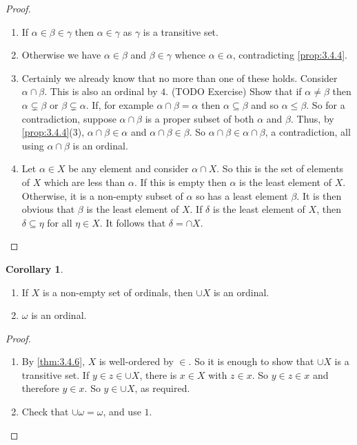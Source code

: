 \documentclass{article}
\theoremstyle{definition}\newtheorem{definition}{Definition}[subsection]
\theoremstyle{definition}\newtheorem{remark}[definition]{Remark}
\theoremstyle{definition}\newtheorem*{example}{Example}
\theoremstyle{definition}\newtheorem*{note}{Note}
\newtheorem{corollary}[definition]{Corollary}
\begin{document}
\begin{proof}
\hfill
\begin{enumerate}
\item If $ \alpha \in \beta \in \gamma $ then $ \alpha \in \gamma $ as $ \gamma $ is a transitive set.
\item Otherwise we have $ \alpha \in \beta $ and $ \beta \in \gamma $ whence $ \alpha \in \alpha $, contradicting \ref{prop:3.4.4}.
\item Certainly we already know that no more than one of these holds. Consider $ \alpha \cap \beta $. This is also an ordinal by $ 4 $. (TODO Exercise) Show that if $ \alpha \ne \beta $ then $ \alpha \subsetneq \beta $ or $ \beta \subsetneq \alpha $. If, for example $ \alpha \cap \beta = \alpha $ then $ \alpha \subseteq \beta $ and so $ \alpha \le \beta $. So for a contradiction, suppose $ \alpha \cap \beta $ is a proper subset of both $ \alpha $ and $ \beta $. Thus, by \ref{prop:3.4.4}(3), $ \alpha \cap \beta \in \alpha $ and $ \alpha \cap \beta \in \beta $. So $ \alpha \cap \beta \in \alpha \cap \beta $, a contradiction, all using $ \alpha \cap \beta $ is an ordinal.
\item Let $ \alpha \in X $ be any element and consider $ \alpha \cap X $. So this is the set of elements of $ X $ which are less than $ \alpha $. If this is empty then $ \alpha $ is the least element of $ X $. Otherwise, it is a non-empty subset of $ \alpha $ so has a least element $ \beta $. It is then obvious that $ \beta $ is the least element of $ X $. If $ \delta $ is the least element of $ X $, then $ \delta \subseteq \eta $ for all $ \eta \in X $. It follows that $ \delta = \cap X $.
\end{enumerate}
\end{proof}

\begin{corollary}
\hfill
\begin{enumerate}
\item If $ X $ is a non-empty set of ordinals, then $ \cup X $ is an ordinal.
\item $ \omega $ is an ordinal.
\end{enumerate}
\end{corollary}

\begin{proof}
\hfill
\begin{enumerate}
\item By \ref{thm:3.4.6}, $ X $ is well-ordered by $ \in $. So it is enough to show that $ \cup X $ is a transitive set. If $ y \in z \in \cup X $, there is $ x \in X $ with $ z \in x $. So $ y \in z \in x $ and therefore $ y \in x $. So $ y \in \cup X $, as required.
\item Check that $ \cup \omega = \omega $, and use $ 1 $.
\end{enumerate}
\end{proof}
\end{document}
